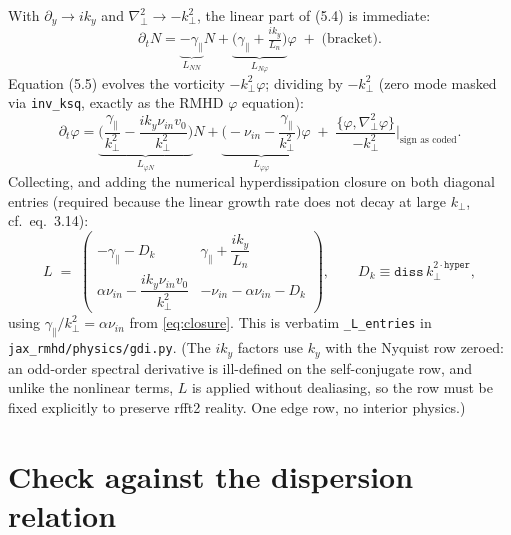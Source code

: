 \documentclass[11pt]{article}
\newcommand{\kp}{k_\perp}
\newcommand{\gpar}{\gamma_\parallel}
\newcommand{\nuin}{\nu_{in}}
\begin{document}
With $\partial_y \to i k_y$ and $\nabla_\perp^2 \to -\kp^2$, the linear part of (5.4) is
immediate:
\begin{equation}
\partial_t N = \underbrace{-\gpar}_{L_{NN}} N
 + \underbrace{\Big(\gpar + \tfrac{i k_y}{L_n}\Big)}_{L_{N\varphi}} \varphi
 \;+\; \text{(bracket)}.
\end{equation}
Equation (5.5) evolves the vorticity $-\kp^2\varphi$; dividing by $-\kp^2$
(zero mode masked via \texttt{inv\_ksq}, exactly as the RMHD $\varphi$ equation):
\begin{equation}
\partial_t \varphi
 = \underbrace{\Big(\frac{\gpar}{\kp^2} - \frac{i k_y \nuin v_0}{\kp^2}\Big)}_{L_{\varphi N}} N
 + \underbrace{\Big(-\nuin - \frac{\gpar}{\kp^2}\Big)}_{L_{\varphi\varphi}} \varphi
 \;+\; \frac{\{\varphi,\nabla_\perp^2\varphi\}}{-\kp^2}\Big|_{\text{sign as coded}}.
\end{equation}
Collecting, and adding the numerical hyperdissipation closure on both diagonal entries
(required because the linear growth rate does not decay at large $\kp$, cf.\ eq.~3.14):
\begin{equation}
\boxed{\;
L \;=\;
\begin{pmatrix}
 -\gpar - D_k & \gpar + \dfrac{i k_y}{L_n}\\[2ex]
 \alpha\nuin - \dfrac{i k_y \nuin v_0}{\kp^2} & -\nuin - \alpha\nuin - D_k
\end{pmatrix},
\qquad D_k \equiv \texttt{diss}\,\kp^{2\cdot\texttt{hyper}},
\;}
\label{eq:L}
\end{equation}
using $\gpar/\kp^2=\alpha\nuin$ from \eqref{eq:closure}. This is verbatim
\texttt{\_L\_entries} in \texttt{jax\_rmhd/physics/gdi.py}. (The $ik_y$ factors use
$k_y$ with the Nyquist row zeroed: an odd-order spectral derivative is ill-defined on the
self-conjugate row, and unlike the nonlinear terms, $L$ is applied without dealiasing, so
the row must be fixed explicitly to preserve rfft2 reality. One edge row, no interior
physics.)

\section{Check against the dispersion relation}
\end{document}
